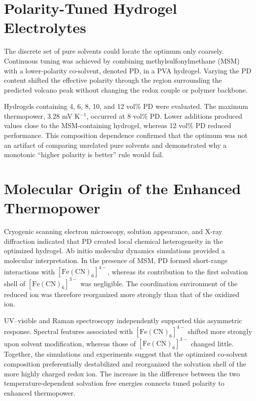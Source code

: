 \section{Polarity-Tuned Hydrogel Electrolytes}

The discrete set of pure solvents could locate the optimum only coarsely.
Continuous tuning was achieved by combining methylsulfonylmethane (MSM) with a
lower-polarity co-solvent, denoted PD, in a PVA hydrogel. Varying the PD content
shifted the effective polarity through the region surrounding the predicted
volcano peak without changing the redox couple or polymer backbone.

Hydrogels containing 4, 6, 8, 10, and 12 vol\% PD were evaluated. The maximum
thermopower, 3.28 mV K$^{-1}$, occurred at 8 vol\% PD. Lower additions
produced values close to the MSM-containing hydrogel, whereas 12 vol\% PD
reduced performance. This composition dependence confirmed that the optimum
was not an artifact of comparing unrelated pure solvents and demonstrated why
a monotonic ``higher polarity is better'' rule would fail.

\section{Molecular Origin of the Enhanced Thermopower}

Cryogenic scanning electron microscopy, solution appearance, and X-ray
diffraction indicated that PD created local chemical heterogeneity in the
optimized hydrogel. Ab initio molecular dynamics simulations provided a
molecular interpretation. In the presence of MSM, PD formed short-range
interactions with $[\mathrm{Fe(CN)}_6]^{4-}$, whereas its contribution to the
first solvation shell of $[\mathrm{Fe(CN)}_6]^{3-}$ was negligible. The
coordination environment of the reduced ion was therefore reorganized more
strongly than that of the oxidized ion.

UV--visible and Raman spectroscopy independently supported this asymmetric
response. Spectral features associated with
$[\mathrm{Fe(CN)}_6]^{4-}$ shifted more strongly upon solvent modification,
whereas those of $[\mathrm{Fe(CN)}_6]^{3-}$ changed little. Together, the
simulations and experiments suggest that the optimized co-solvent composition
preferentially destabilized and reorganized the solvation shell of the more
highly charged redox ion. The increase in the difference between the two
temperature-dependent solvation free energies connects tuned polarity to
enhanced thermopower.

